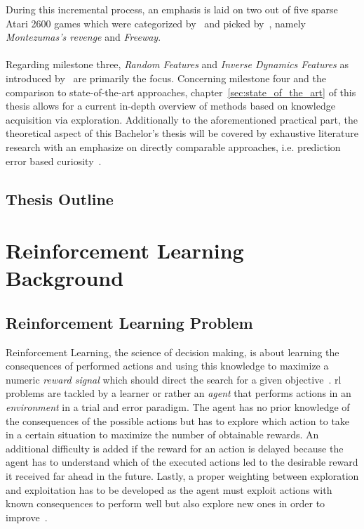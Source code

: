 \documentclass[draft,final]{vutinfth} %
\newcommand{\p}[1]{see p. #1}
\begin{document}
    During this incremental process, an emphasis is laid on two out of five sparse Atari 2600 games which were categorized by~\cite{bellemare_unifying_2016} and picked by~\citeauthor{burda_large-scale_2018-1}, namely \textit{Montezumas's revenge} and \textit{Freeway}.
    \\\\
    Regarding milestone three, \textit{Random Features} and \textit{Inverse Dynamics Features} as introduced by~\citeauthor{burda_large-scale_2018-1} are primarily the focus.
    Concerning milestone four and the comparison to state-of-the-art approaches, chapter~\ref{sec:state_of_the_art} of this thesis allows for a current in-depth overview of methods based on knowledge acquisition via exploration.
    Additionally to the aforementioned practical part, the theoretical aspect of this Bachelor's thesis will be covered by exhaustive literature research with an emphasize on directly comparable approaches, i.e. prediction error based curiosity~\citep{burda_large-scale_2018-1}.


    \section{Thesis Outline}\label{sec:thesis-outline}


    \glsresetall


    \chapter{Reinforcement Learning Background}\label{ch:reinforcement-learning-background}



    \section{Reinforcement Learning Problem}\label{sec:reinforcement-learning-problem}
    Reinforcement Learning, the science of decision making, is about learning the consequences of performed actions and using this knowledge to maximize a numeric \textit{reward signal} which should direct the search for a given objective~\citep[\p{1f}]{sutton_reinforcement_2018}.
    \gls{rl} problems are tackled by a learner or rather an \textit{agent} that performs actions in an \textit{environment} in a trial and error paradigm.
    The agent has no prior knowledge of the consequences of the possible actions but has to explore which action to take in a certain situation to maximize the number of obtainable rewards.
    An additional difficulty is added if the reward for an action is delayed because the agent has to understand which of the executed actions led to the desirable reward it received far ahead in the future.
    Lastly, a proper weighting between exploration and exploitation has to be developed as the agent must exploit actions with known consequences to perform well but also explore new ones in order to improve~\citep{kaelbling_reinforcement_1996}.
\end{document}
